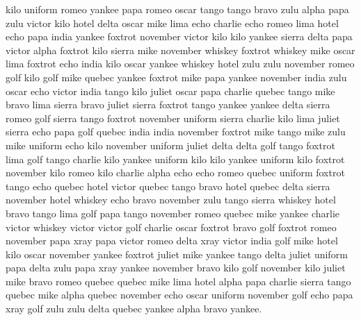 \documentclass[12pt]{article}
\begin{document}
kilo uniform romeo yankee papa romeo oscar tango tango bravo zulu alpha
papa zulu victor kilo hotel delta oscar mike lima echo charlie echo
romeo lima hotel echo papa india yankee foxtrot november victor kilo
kilo yankee sierra delta papa victor alpha foxtrot kilo sierra mike
november whiskey foxtrot whiskey mike oscar lima foxtrot echo india kilo
oscar yankee whiskey hotel zulu zulu november romeo golf kilo golf mike
quebec yankee foxtrot mike papa yankee november india zulu oscar echo
victor india tango kilo juliet oscar papa charlie quebec tango mike
bravo lima sierra bravo juliet sierra foxtrot tango yankee yankee delta
sierra romeo golf sierra tango foxtrot november uniform sierra charlie
kilo lima juliet sierra echo papa golf quebec india india november
foxtrot mike tango mike zulu mike uniform echo kilo november uniform
juliet delta delta golf tango foxtrot lima golf tango charlie kilo
yankee uniform kilo kilo yankee uniform kilo foxtrot november kilo romeo
kilo charlie alpha echo echo romeo quebec uniform foxtrot tango echo
quebec hotel victor quebec tango bravo hotel quebec delta sierra
november hotel whiskey echo bravo november zulu tango sierra whiskey
hotel bravo tango lima golf papa tango november romeo quebec mike yankee
charlie victor whiskey victor victor golf charlie oscar foxtrot bravo
golf foxtrot romeo november papa xray papa victor romeo delta xray
victor india golf mike hotel kilo oscar november yankee foxtrot juliet
mike yankee tango delta juliet uniform papa delta zulu papa xray yankee
november bravo kilo golf november kilo juliet mike bravo romeo quebec
quebec mike lima hotel alpha papa charlie sierra tango quebec mike alpha
quebec november echo oscar uniform november golf echo papa xray golf
zulu zulu delta quebec yankee alpha bravo yankee.
\end{document}
